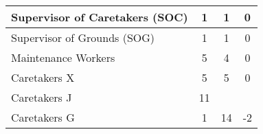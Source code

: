 \begin{tabular}{l|c|c|c|}
        \multicolumn{1}{|l|}{\cellcolor{ccfuschialight}Supervisor of Caretakers (SOC)} & 1                                                      & 1                                                                & 0                                                      \\ \hline
        \multicolumn{1}{|l|}{\cellcolor{ccfuschialight}Supervisor of Grounds (SOG)}    & 1                                                      & 1                                                                & 0                                                      \\ \hline
        \multicolumn{1}{|l|}{\cellcolor{ccfuschialight}Maintenance Workers}            & 5                                                      & 4                                                                & 0                                                       \\ \hline
        \multicolumn{1}{|l|}{\cellcolor{ccfuschialight}Caretakers X}                   & 5                                                      & 5                                                                & 0                                                      \\ \hline
        \multicolumn{1}{|l|}{\cellcolor{ccfuschialight}Caretakers J\tnote{1}}                   & 11                                                      &                                                                 &                                                         \\ \cline{1-2}
        \multicolumn{1}{|l|}{\cellcolor{ccfuschialight}Caretakers G}                   & 1                                                      & \multirow{-2}{*}{14}                                     & \multirow{-2}{*}{-2}                           \\ \hline
        \end{tabular}
        
        